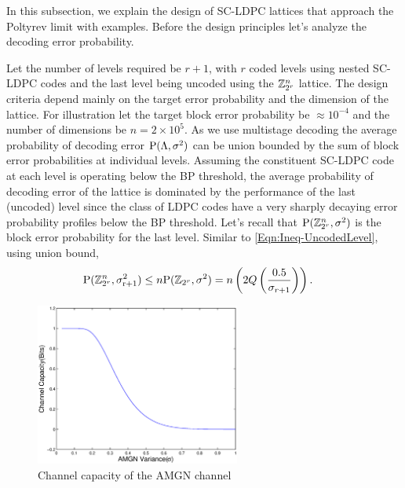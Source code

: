In this subsection, we explain the design of SC-LDPC lattices that approach the Poltyrev limit with examples. Before the design principles  let's analyze the decoding error probability.

Let the number of levels required be $r+1$, with $r$ coded levels using nested SC-LDPC codes and the last level being uncoded using the $\mathbb{Z}_{2^r}^{n}$ lattice. The design criteria depend mainly on the target error probability and the dimension of the lattice. For illustration let the  target block error probability be $\approx10^{-4}$ and the number of dimensions be $n=2 \times 10^{5}$.
As we use multistage decoding the average probability of decoding error $\text{P}(\Lambda,\sigma^{2})$ can be union bounded by the sum of block error probabilities at individual levels. Assuming the constituent SC-LDPC code at each level is operating below the BP threshold\cite{richardson2008modern}, the average probability of decoding error of the lattice is dominated by the performance of the last (uncoded) level since the class of LDPC codes have a very sharply decaying error probability profiles below the BP threshold. Let's recall that  $\text{P}(\mathbb{Z}_{2^r}^{n},\sigma^{2})$ is the block error probability for the last level. Similar to \eqref{Eqn:Ineq-UncodedLevel}, using union bound,
\begin{align}
\text{P}(\mathbb{Z}_{2^r}^{n},\sigma_{\text{r+1}}^{2})&\leq n\text{P}(\mathbb{Z}_{2^r},\sigma^{2})=n\left(2Q\left(\frac{0.5}{\sigma_{r+1}}\right)	\right).
\label{Eqn:ZLatticeProb}
\end{align}

\begin{figure}[!ht]
\centering
\includegraphics[width=0.6\textwidth]{./figures/SCLDPC_lattices/Cap_integer_coset_lattice.eps}
\caption{Channel capacity of the AMGN channel}
\label{Fig:AMGNCapacity}
\end{figure}


